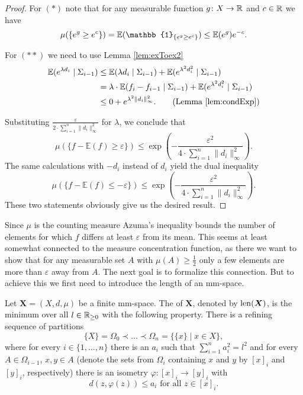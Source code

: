 \begin{proof}
	For $(\ast)$ note that for any measurable function $g\colon X\to\mathbb{R}$ and $c\in\mathbb{R}$ we have %
	\[\mu(\{e^g\geq e^c\})=\E(\mathbb{1}_{\{e^g\geq e^c\}})\leq\E(e^g)e^{-c}.\]
				
	For $(\ast\ast)$ we need to use Lemma \ref{lem:exToex2}
	\begin{align*}
		\E(e^{\lambda d_i}\mid \Sigma_{i-1}) & \leq \E(\lambda d_i\mid\Sigma_{i-1})+\E(e^{\lambda^2 d^2_i}\mid\Sigma_{i-1})            \\
		                                     & =\lambda\cdot\E( f_i-f_{i-1}\mid\Sigma_{i-1}) + \E(e^{\lambda^2 d^2_i}\mid\Sigma_{i-1}) \\
		                                     & \leq 0 + e^{\lambda^2 \|d_i\|_\infty^2}.\tag{Lemma \ref{lem:condExp}}                   
	\end{align*}
				
	Substituting $\frac{\varepsilon}{2\cdot\sum_{i=1}^{n}\|d_i\|_\infty^2}$ for $\lambda$, we conclude that
	\[\mu(\{f-\mathbb{E}(f)\geq \varepsilon\})\leq\exp\left(-\frac{\varepsilon^2}{4\cdot\sum_{i=1}^{n}\|d_i\|^2_\infty}\right). \]
	The same calculations with $-d_i$ instead of $d_i$ yield the dual inequality
	\[\mu(\{f-\mathbb{E}(f)\leq -\varepsilon\})\leq\exp\left(-\frac{\varepsilon^2}{4\cdot\sum_{i=1}^{n}\|d_i\|^2_\infty}\right). \]
	These two statements obviously give us the desired result.
\end{proof}
		
Since $\mu$ is the counting measure Azuma's inequality bounds the number of elements for which $f$ differs at least $\varepsilon$ from its mean. This seems at least somewhat connected to the measure concentration function, as there we want to show that for any measurable set $A$ with $\mu(A)\geq\frac{1}{2}$ only a few elements are more than $\varepsilon$ away from $A$.
The next goal is to formalize this connection. %
But to achieve this we first need to introduce the length of an mm-space.
\begin{definition}\label{def:length}
	Let $\boldsymbol{X}=(X,d,\mu)$ be a finite mm-space. The  of $\boldsymbol X$, denoted by $\operatorname{len}(\boldsymbol{X})$, is the minimum over all $l\in\mathbb{R}_{\geq0}$ with the following property. There is a refining sequence of partitions 
	\[\{X\}=\Omega_0\prec\dots\prec\Omega_n=\{\{x\}\mid x\in X\},\]
	where for every $i\in\{1,\dots,n\}$ there is an $a_i$ such that $\sum_{i=1}^{n}a^2_i=l^2$ and for every $A\in \Omega_{i-1}$, $x,y\in A$ (denote the sets from $\Omega_i$ containing $x$ and $y$ by $[x]_i$ and $[y]_i$, respectively) there is an isometry $\varphi\colon[x]_i\to [y]_i$ with 
	\[d(z,\varphi(z))\leq a_i\text{ for all $z\in[x]_i$.}\]
\end{definition}

